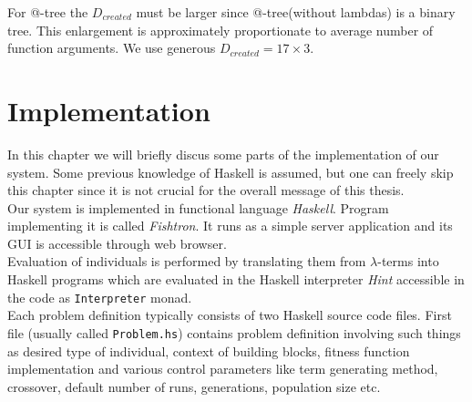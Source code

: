 \documentclass[12pt,a4paper]{report}
\makeatletter
\newcommand{\lterms}{$\lambda$-terms\xspace}
\newcommand{\atTree}{@-tree\xspace}
\newenvironment{todo}
{ ~\\[0.5em]
  {\color{red}\textbf{TODO}}
  \begin{easylist}[itemize]}
{ \end{easylist}
  ~}
\makeatother
\begin{document}
For \atTree the $D_{created}$ must be larger since
\atTree (without lambdas) is a binary tree. This 
enlargement is approximately proportionate to average number of 
function arguments. We use generous $D_{created} = 17\times3$. 


%
% 
%
%
%
%






\chapter{ Implementation }	

In this chapter we will briefly discus some parts of the implementation
of our system. Some previous knowledge of Haskell is assumed, but one can
freely skip this chapter since it is not crucial for the 
overall message of this thesis. \\

Our system is implemented in functional language \textit{Haskell}.
Program implementing it is called \textit{Fishtron}.
It runs as a simple server application and its GUI is
accessible through web browser.\\



Evaluation of individuals is performed by translating them
from \lterms into Haskell programs which are evaluated
in the Haskell interpreter \textit{Hint} accessible 
in the code as \texttt{Interpreter} monad.  \\

Each problem definition typically consists of two Haskell 
source code files. First file (usually called \texttt{Problem.hs}) 
contains problem definition involving such things as desired 
type of individual, context of building blocks, 
fitness function implementation and various control parameters 
like term generating method, crossover,
default number of runs, generations, population size etc. 
\end{document}
